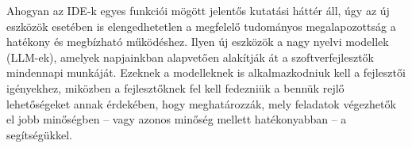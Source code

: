 \documentclass[12pt,a4paper]{extarticle}
\begin{document}
Ahogyan az IDE-k egyes funkciói mögött jelentős kutatási háttér áll, úgy az új eszközök esetében is elengedhetetlen a megfelelő tudományos megalapozottság a hatékony és meg\-bíz\-ha\-tó működéshez.
Ilyen új eszközök a nagy nyelvi modellek (LLM-ek), amelyek napjainkban alapvetően alakítják át a szoftverfejlesztők mindennapi munkáját.
Ezeknek a modelleknek is alkalmazkodniuk kell a fejlesztői igényekhez, miközben a fejlesztőknek fel kell fedezniük a bennük rejlő lehetőségeket annak érdekében, hogy meghatározzák, mely feladatok végezhetők el jobb minőségben – vagy azonos minőség mellett hatékonyabban – a segítségükkel.
\end{document}
